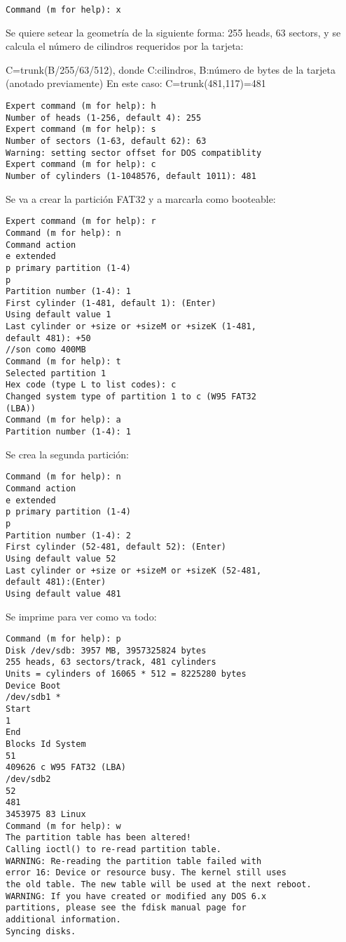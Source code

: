 \bigskip
\begin{verbatim}
Command (m for help): x 
\end{verbatim}

Se quiere setear la geometría de la siguiente forma: 255 heads, 63 sectors, y se calcula el 
número de cilindros requeridos por la tarjeta: 

\bigskip
C=trunk(B/255/63/512), donde C:cilindros, B:número de bytes de la tarjeta (anotado previamente) 
En este caso: C=trunk(481,117)=481 

\begin{verbatim}
Expert command (m for help): h 
Number of heads (1-256, default 4): 255 
Expert command (m for help): s 
Number of sectors (1-63, default 62): 63 
Warning: setting sector offset for DOS compatiblity 
Expert command (m for help): c 
Number of cylinders (1-1048576, default 1011): 481 
\end{verbatim}


Se va a crear la partición FAT32 y a marcarla como booteable: 

\begin{verbatim}
Expert command (m for help): r 
Command (m for help): n 
Command action 
e extended 
p primary partition (1-4) 
p 
Partition number (1-4): 1 
First cylinder (1-481, default 1): (Enter) 
Using default value 1 
Last cylinder or +size or +sizeM or +sizeK (1-481, 
default 481): +50 
//son como 400MB 
Command (m for help): t 
Selected partition 1 
Hex code (type L to list codes): c 
Changed system type of partition 1 to c (W95 FAT32 
(LBA)) 
Command (m for help): a 
Partition number (1-4): 1 
\end{verbatim}

Se crea la segunda partición: 

\begin{verbatim}
Command (m for help): n 
Command action 
e extended 
p primary partition (1-4) 
p 
Partition number (1-4): 2 
First cylinder (52-481, default 52): (Enter) 
Using default value 52 
Last cylinder or +size or +sizeM or +sizeK (52-481, 
default 481):(Enter) 
Using default value 481 
\end{verbatim}

Se imprime para ver como va todo: 

\begin{verbatim}
Command (m for help): p 
Disk /dev/sdb: 3957 MB, 3957325824 bytes 
255 heads, 63 sectors/track, 481 cylinders 
Units = cylinders of 16065 * 512 = 8225280 bytes 
Device Boot 
/dev/sdb1 * 
Start 
1 
End 
Blocks Id System 
51 
409626 c W95 FAT32 (LBA) 
/dev/sdb2 
52 
481 
3453975 83 Linux 
Command (m for help): w 
The partition table has been altered! 
Calling ioctl() to re-read partition table. 
WARNING: Re-reading the partition table failed with 
error 16: Device or resource busy. The kernel still uses 
the old table. The new table will be used at the next reboot. 
WARNING: If you have created or modified any DOS 6.x 
partitions, please see the fdisk manual page for 
additional information. 
Syncing disks. 
\end{verbatim}

